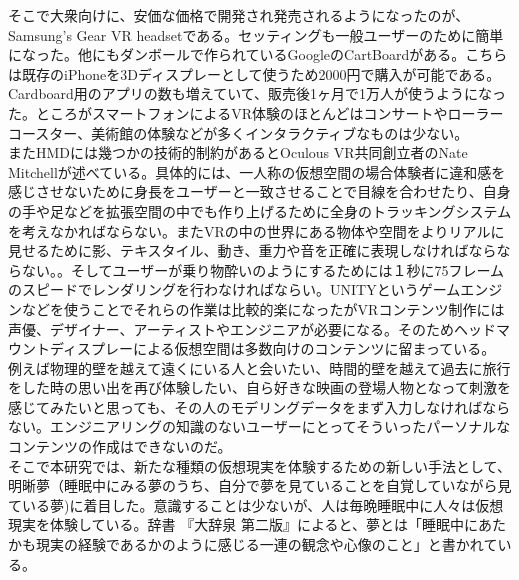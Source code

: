そこで大衆向けに、安価な価格で開発され発売されるようになったのが、Samsung's Gear VR headsetである\cite{samsung}。セッティングも一般ユーザーのために簡単になった。他にもダンボールで作られているGoogleのCartBoardがある。こちらは既存のiPhoneを3Dディスプレーとして使うため2000円で購入が可能である。Cardboard用のアプリの数も増えていて、販売後1ヶ月で1万人が使うようになった\cite{cardboard}。ところがスマートフォンによるVR体験のほとんどはコンサートやローラーコースター、美術館の体験などが多くインタラクティブなものは少ない。\\

またHMDには幾つかの技術的制約があるとOculous VR共同創立者のNate Mitchellが述べている\cite{oculus}。具体的には、一人称の仮想空間の場合体験者に違和感を感じさせないために身長をユーザーと一致させることで目線を合わせたり、自身の手や足などを拡張空間の中でも作り上げるために全身のトラッキングシステムを考えなかればならない。またVRの中の世界にある物体や空間をよりリアルに見せるために影、テキスタイル、動き、重力や音を正確に表現しなければならならない\cite{vrtrendShiny}。。そしてユーザーが乗り物酔いのようにするためには１秒に75フレームのスピードでレンダリングを行わなければならい\cite{HMDifficulties}。UNITYというゲームエンジンなどを使うことでそれらの作業は比較的楽になったがVRコンテンツ制作には声優、デザイナー、アーティストやエンジニアが必要になる。そのためヘッドマウントディスプレーによる仮想空間は多数向けのコンテンツに留まっている。\\

例えば物理的壁を越えて遠くにいる人と会いたい、時間的壁を越えて過去に旅行をした時の思い出を再び体験したい、自ら好きな映画の登場人物となって刺激を感じてみたいと思っても、その人のモデリングデータをまず入力しなければならない。エンジニアリングの知識のないユーザーにとってそういったパーソナルなコンテンツの作成はできないのだ。\\

そこで本研究では、新たな種類の仮想現実を体験するための新しい手法として、明晰夢（睡眠中にみる夢のうち、自分で夢を見ていることを自覚していながら見ている夢)に着目した。意識することは少ないが、人は毎晩睡眠中に人々は仮想現実を体験している。辞書 『大辞泉 第二版』によると、夢とは「睡眠中にあたかも現実の経験であるかのように感じる一連の観念や心像のこと」\cite{dream}と書かれている。\\

